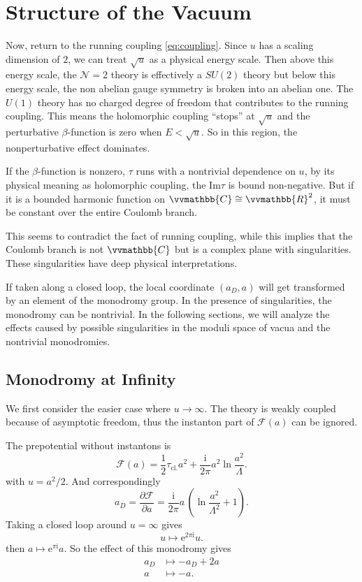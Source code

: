 \documentclass{article}
\begin{document}
\section{Structure of the Vacuum}
Now, return to the running coupling \eqref{eq:coupling}. Since $u$ has a scaling dimension of $2$, we can treat $\sqrt{u}$ as a physical energy scale. Then above this energy scale, the $\mathcal{N}=2$ theory is effectively a $SU(2)$ theory but below this energy scale, the non abelian gauge symmetry is broken into an abelian one. The $U(1)$ theory has no charged degree of freedom that contributes to the running coupling. This means the holomorphic coupling ``stops'' at $\sqrt{u}$ and the perturbative $\beta$-function is zero when $E<\sqrt{u}$. So in this region, the nonperturbative effect dominates.

If the $\beta$-function is nonzero, $\tau$ runs with a nontrivial dependence on $u$, by its physical meaning as holomorphic coupling, the $\mathrm{Im}\tau$ is bound non-negative. But if it is a bounded harmonic function on $\vvmathbb{C} \cong \vvmathbb{R}^2$, it must be constant over the entire Coulomb branch. 

This seems to contradict the fact of running coupling, while this implies that the Coulomb branch is not $\vvmathbb{C}$ but is a complex plane with singularities. These singularities have deep physical interpretations. 

If taken along a closed loop, the local coordinate $(a_D,a)$ will get transformed by an element of the monodromy group. In the presence of singularities, the monodromy can be nontrivial. In the following sections, we will analyze the effects caused by possible singularities in the moduli space of vacua and the nontrivial monodromies.

\subsection{Monodromy at Infinity}
We first consider the easier case where $u\to \infty$. The theory is weakly coupled because of asymptotic freedom, thus the instanton part of $\mathscr{F}(a)$ can be ignored.

The prepotential without instantons is
\begin{equation}
    \mathscr{F}(a)=\frac{1}{2}\tau_{\mathrm{cl.}}a^2+\frac{\mathrm{i}}{2\pi}a^2\ln{\frac{a^2}{\Lambda}}.
\end{equation}
with $u=a^2/2$. And correspondingly
\begin{equation}
    a_D=\frac{\partial \mathscr{F}}{\partial a}=\frac{\mathrm{i}}{2\pi}a\,(\ln{\frac{a^2}{\Lambda^2}}+1).
\end{equation}
Taking a closed loop around $u=\infty$ gives
\begin{equation}
    u\mapsto \mathrm{e}^{2\pi\mathrm{i}} u.
\end{equation}
then $a\mapsto \mathrm{e}^{\pi\mathrm{i}} a$. So the effect of this monodromy gives
\begin{equation}
\begin{aligned}
   a_{D} &\mapsto -a_{D}+2 a \\
    a &\mapsto -a.
\end{aligned}
\end{equation}
\end{document}
